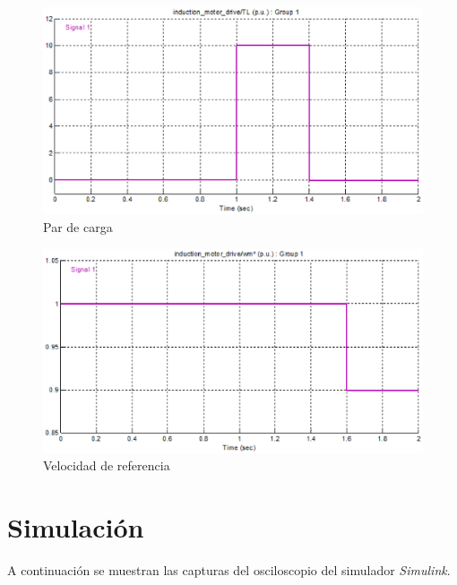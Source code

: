 \documentclass[11pt, a4paper]{article}
\begin{document}
\begin{figure}[H]
\centering
\includegraphics[scale=0.75]{imagenes/par}
\caption{Par de carga}
\label{par}
\end{figure}

\begin{figure}[H]
\centering
\includegraphics[scale=0.75]{imagenes/velocidad}
\caption{Velocidad de referencia}
\label{vel}
\end{figure}


\newpage
\section{Simulación}
A continuación se muestran las capturas del osciloscopio del simulador \emph{Simulink}.\\
\end{document}
